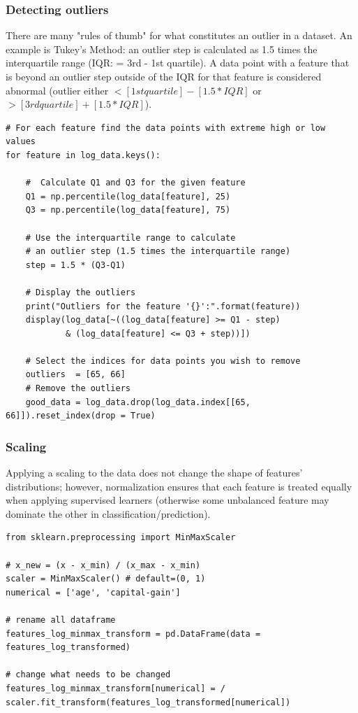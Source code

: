 \documentclass[11pt]{article}
\begin{document}
\subsubsection*{Detecting outliers}
There are many "rules of thumb" for what constitutes an outlier in a dataset. An example is Tukey's Method: an outlier step is calculated as 1.5 times the interquartile range (IQR: = 3rd - 1st quartile). A data point with a feature that is beyond an outlier step outside of the IQR for that feature is considered abnormal (outlier either $< [1st quartile] - [1.5 * IQR]$ or $> [3rd quartile] + [1.5 * IQR]$).
\begin{lstlisting}
# For each feature find the data points with extreme high or low values
for feature in log_data.keys():	
	
	#  Calculate Q1 and Q3 for the given feature
	Q1 = np.percentile(log_data[feature], 25)
	Q3 = np.percentile(log_data[feature], 75)

	# Use the interquartile range to calculate
	# an outlier step (1.5 times the interquartile range)
	step = 1.5 * (Q3-Q1)

	# Display the outliers
	print("Outliers for the feature '{}':".format(feature))
	display(log_data[~((log_data[feature] >= Q1 - step) 
			& (log_data[feature] <= Q3 + step))])

	# Select the indices for data points you wish to remove
	outliers  = [65, 66]
	# Remove the outliers
	good_data = log_data.drop(log_data.index[[65, 66]]).reset_index(drop = True)
\end{lstlisting}

\subsubsection*{Scaling}
Applying a scaling to the data does not change the shape of features' distributions; however, normalization ensures that each feature is treated equally when applying supervised learners (otherwise some unbalanced feature may dominate the other in classification/prediction).

\begin{lstlisting}
from sklearn.preprocessing import MinMaxScaler

# x_new = (x - x_min) / (x_max - x_min)
scaler = MinMaxScaler() # default=(0, 1)
numerical = ['age', 'capital-gain']

# rename all dataframe
features_log_minmax_transform = pd.DataFrame(data = features_log_transformed)

# change what needs to be changed
features_log_minmax_transform[numerical] = /
scaler.fit_transform(features_log_transformed[numerical])
\end{lstlisting}
\end{document}
